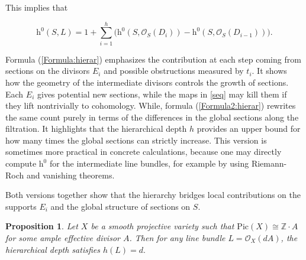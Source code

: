 \documentclass[14pt]{amsart}
\theoremstyle{plain}
\newtheorem{prop}[thm]{\bf Proposition}
\theoremstyle{definition}
\theoremstyle{remark}
\theoremstyle{example}
\def \h{\mathrm{h}}
\def \Z{\mathbb{Z}}
\def \O{\mathcal{O}}
\def \Pic{\mathrm{Pic}}
\begin{document}
This implies that

\begin{equation}
\label{Formula2:hierar}
\h^0(S,L)=1+\sum_{i=1}^h\big(\h^0(S,\O_S(D_i))-\h^0(S,\O_S(D_{i-1}))\big).
\end{equation}

Formula (\ref{Formula:hierar}) emphasizes the contribution at each step coming from sections on the divisors $E_i$ and possible obstructions measured by $t_i$. 
It shows how the geometry of the intermediate divisors controls the growth of sections. Each $E_i$ gives potential new sections, while the maps in \eqref{seq} may kill them if they lift nontrivially to cohomology. While, formula (\ref{Formula2:hierar}) rewrites the same count purely in terms of the differences in the global sections along the filtration.
It highlights that the hierarchical depth $h$ provides an upper bound for how many times the global sections can strictly increase.
This version is sometimes more practical in concrete calculations, because one may directly compute $\h^0$ for the intermediate line bundles, for example by using Riemann-Roch and vanishing theorems.

Both versions together show that the hierarchy bridges local contributions on the supports $E_i$ and the global structure of sections on $S$.

\begin{prop}
\label{prop:hierar_dA}
Let $X$ be a smooth projective variety such that $\Pic(X)\cong\Z\cdot A$ for some ample effective divisor $A$. Then for any line bundle $L=\O_X(dA)$, the hierarchical depth satisfies $h(L)=d.$
\end{prop}
\end{document}
